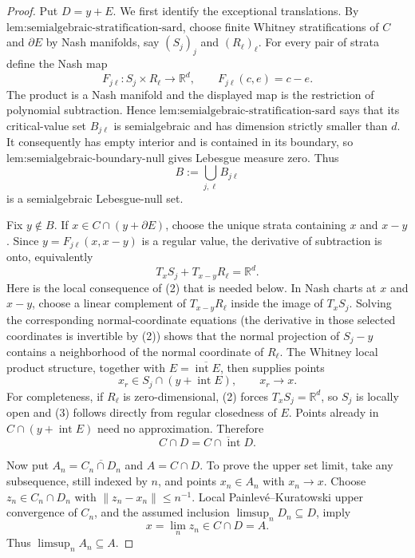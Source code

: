 \documentclass{article}
\begin{document}
\begin{proof}
Put \(D=y+E\).  We first identify the exceptional translations.  By \(\text{lem:semialgebraic-stratification-sard}\), choose finite Whitney stratifications of \(C\) and \(\partial E\) by Nash manifolds, say \((S_j)_j\) and \((R_\ell)_\ell\).  For every pair of strata define the Nash map
\[
 F_{j\ell}:S_j\times R_\ell\longrightarrow\mathbb R^d,
 \qquad F_{j\ell}(c,e)=c-e.
\]
The product is a Nash manifold and the displayed map is the restriction of polynomial subtraction.  Hence \(\text{lem:semialgebraic-stratification-sard}\) says that its critical-value set \(B_{j\ell}\) is semialgebraic and has dimension strictly smaller than \(d\).  It consequently has empty interior and is contained in its boundary, so \(\text{lem:semialgebraic-boundary-null}\) gives Lebesgue measure zero.  Thus
\[
 B:=\bigcup_{j,\ell}B_{j\ell}
 \tag{1}
\]
is a semialgebraic Lebesgue-null set.

Fix \(y\notin B\).  If \(x\in C\cap(y+\partial E)\), choose the unique strata containing \(x\) and \(x-y\).  Since \(y=F_{j\ell}(x,x-y)\) is a regular value, the derivative of subtraction is onto, equivalently
\[
 T_xS_j+T_{x-y}R_\ell=\mathbb R^d.
 \tag{2}
\]
Here is the local consequence of (2) that is needed below.  In Nash charts at \(x\) and \(x-y\), choose a linear complement of \(T_{x-y}R_\ell\) inside the image of \(T_xS_j\).  Solving the corresponding normal-coordinate equations (the derivative in those selected coordinates is invertible by (2)) shows that the normal projection of \(S_j-y\) contains a neighborhood of the normal coordinate of \(R_\ell\).  The Whitney local product structure, together with \(E=\overline{\operatorname{int}E}\), then supplies points
\[
 x_r\in S_j\cap(y+\operatorname{int}E),
 \qquad x_r\longrightarrow x.
 \tag{3}
\]
For completeness, if \(R_\ell\) is zero-dimensional, (2) forces \(T_xS_j=\mathbb R^d\), so \(S_j\) is locally open and (3) follows directly from regular closedness of \(E\).  Points already in \(C\cap(y+\operatorname{int}E)\) need no approximation.  Therefore
\[
 C\cap D=\overline{C\cap\operatorname{int}D}.
 \tag{4}
\]

Now put \(A_n=\overline{C_n\cap D_n}\) and \(A=C\cap D\).  To prove the upper set limit, take any subsequence, still indexed by \(n\), and points \(x_n\in A_n\) with \(x_n\to x\).  Choose \(z_n\in C_n\cap D_n\) with \(\lVert z_n-x_n\rVert\le n^{-1}\).  Local Painlev\'e--Kuratowski upper convergence of \(C_n\), and the assumed inclusion \(\limsup_nD_n\subseteq D\), imply
\[
 x=\lim_nz_n\in C\cap D=A.
 \tag{5}
\]
Thus \(\limsup_nA_n\subseteq A\).


\end{proof}
\end{document}
